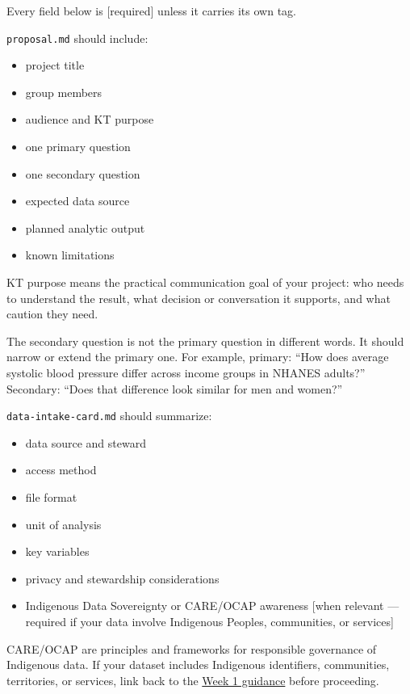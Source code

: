\documentclass[
  letterpaper,
  DIV=11,
  numbers=noendperiod,
  oneside]{scrreprt}
\providecommand{\tightlist}{%
  \setlength{\itemsep}{0pt}\setlength{\parskip}{0pt}}
\begin{document}
Every field below is {[}required{]} unless it carries its own tag.

\texttt{proposal.md} should include:

\begin{itemize}
\tightlist
\item
  project title
\item
  group members
\item
  audience and KT purpose
\item
  one primary question
\item
  one secondary question
\item
  expected data source
\item
  planned analytic output
\item
  known limitations
\end{itemize}

KT purpose means the practical communication goal of your project: who
needs to understand the result, what decision or conversation it
supports, and what caution they need.

The secondary question is not the primary question in different words.
It should narrow or extend the primary one. For example, primary: ``How
does average systolic blood pressure differ across income groups in
NHANES adults?'' Secondary: ``Does that difference look similar for men
and women?''

\texttt{data-intake-card.md} should summarize:

\begin{itemize}
\tightlist
\item
  data source and steward
\item
  access method
\item
  file format
\item
  unit of analysis
\item
  key variables
\item
  privacy and stewardship considerations
\item
  Indigenous Data Sovereignty or CARE/OCAP awareness {[}when relevant
  --- required if your data involve Indigenous Peoples, communities, or
  services{]}
\end{itemize}

CARE/OCAP are principles and frameworks for responsible governance of
Indigenous data. If your dataset includes Indigenous identifiers,
communities, territories, or services, link back to the
\hyperref[health-data-ethics]{Week 1 guidance} before proceeding.
\end{document}

